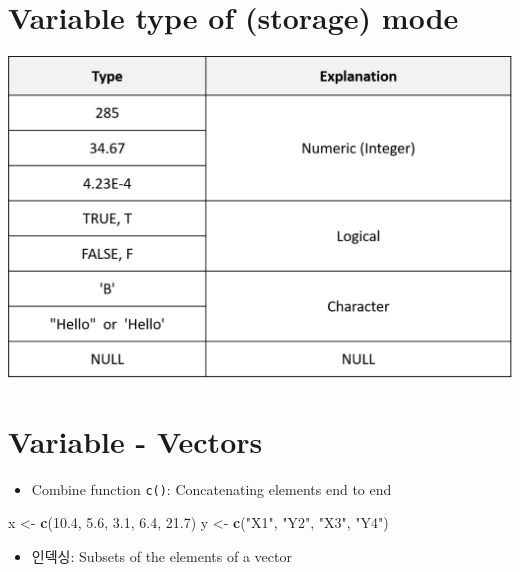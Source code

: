 \documentclass[]{book}
\newenvironment{Shaded}{\begin{snugshade}}{\end{snugshade}}
\newcommand{\KeywordTok}[1]{\textcolor[rgb]{0.13,0.29,0.53}{\textbf{#1}}}
\newcommand{\FloatTok}[1]{\textcolor[rgb]{0.00,0.00,0.81}{#1}}
\newcommand{\StringTok}[1]{\textcolor[rgb]{0.31,0.60,0.02}{#1}}
\newcommand{\NormalTok}[1]{#1}
\providecommand{\tightlist}{%
  \setlength{\itemsep}{0pt}\setlength{\parskip}{0pt}}
\begin{document}
\hypertarget{variable-type-of-storage-mode}{%
\section{Variable type of (storage) mode}\label{variable-type-of-storage-mode}}

\includegraphics{images/01-13.PNG}

\hypertarget{variable---vectors}{%
\section{Variable - Vectors}\label{variable---vectors}}

\begin{itemize}
\tightlist
\item
  Combine function \texttt{c()}: Concatenating elements end to end
\end{itemize}

\begin{Shaded}
\begin{Highlighting}[]
\NormalTok{x <-}\StringTok{ }\KeywordTok{c}\NormalTok{(}\FloatTok{10.4}\NormalTok{, }\FloatTok{5.6}\NormalTok{, }\FloatTok{3.1}\NormalTok{, }\FloatTok{6.4}\NormalTok{, }\FloatTok{21.7}\NormalTok{) }
\NormalTok{y <-}\StringTok{ }\KeywordTok{c}\NormalTok{(}\StringTok{"X1"}\NormalTok{, }\StringTok{"Y2"}\NormalTok{,  }\StringTok{"X3"}\NormalTok{,  }\StringTok{"Y4"}\NormalTok{)}
\end{Highlighting}
\end{Shaded}

\begin{itemize}
\tightlist
\item
  인덱싱: Subsets of the elements of a vector
\end{itemize}
\end{document}
